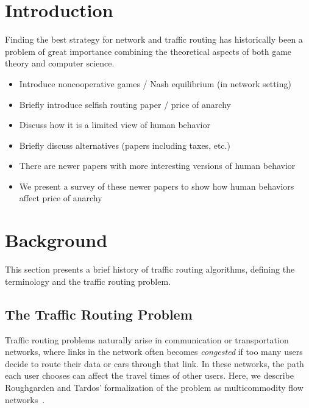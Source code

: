 \documentclass[acmlarge]{acmart}
\begin{document}
\section{Introduction}
Finding the best strategy for network and traffic routing has historically been a problem of great importance combining the theoretical aspects of both game theory and computer science. 
\begin{itemize}
    \item Introduce noncooperative games / Nash equilibrium (in network setting)
    \item Briefly introduce selfish routing paper / price of anarchy
    \item Discuss how it is a limited view of human behavior
    \item Briefly discuss alternatives (papers including taxes, etc.)
    \item There are newer papers with more interesting versions of human behavior
    \item We present a survey of these newer papers to show how human behaviors affect price of anarchy
\end{itemize}

\section{Background}
This section presents a brief history of traffic routing algorithms, defining the terminology
and the traffic routing problem.

\subsection{The Traffic Routing Problem}
Traffic routing problems naturally arise in communication or transportation networks, where
links in the network often becomes \emph{congested} if too many users decide to route their data 
or cars through that link. In these networks, the path each user chooses can affect the travel times of other
users. Here, we describe Roughgarden and Tardos' formalization of the problem as multicommodity flow networks~\cite{tardos,roughgarden}.
\end{document}
